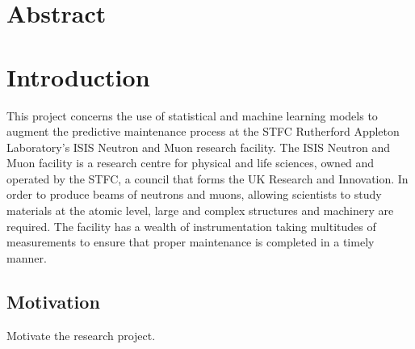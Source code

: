 \documentclass[10pt,oneside]{report}
\begin{document}

\clearpage


\chapter*{Abstract}


\chapter{Introduction}

This project concerns the use of statistical and machine learning models to augment the predictive maintenance process at the STFC Rutherford Appleton Laboratory's ISIS Neutron and Muon research facility. The ISIS Neutron and Muon facility is a research centre for physical and life sciences, owned and operated by the STFC, a council that forms the UK Research and Innovation. In order to produce beams of neutrons and muons, allowing scientists to study materials at the atomic level, large and complex structures and machinery are required. The facility has a wealth of instrumentation taking multitudes of measurements to ensure that proper maintenance is completed in a timely manner. \\


\textbf{ }


\section{Motivation}
Motivate the research project.
\end{document}
